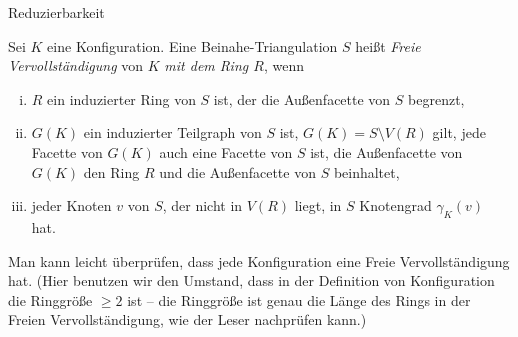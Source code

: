 \begin{section}{Reduzierbarkeit}
 \begin{definition}
  Sei $K$ eine Konfiguration. Eine Beinahe-Triangulation $S$ heißt \textit{Freie Vervollständigung} von $K$ \textit{mit dem Ring $R$}, wenn
  \begin{enumerate}[i)]
   \item $R$ ein induzierter Ring von $S$ ist, der die Außenfacette von $S$ begrenzt,
   \item $G(K)$ ein induzierter Teilgraph von $S$ ist, $G(K) = S \setminus V(R)$ gilt, jede Facette von $G(K)$ auch eine Facette von $S$ ist, die Außenfacette von $G(K)$ den Ring $R$ und die Außenfacette von $S$ beinhaltet,
   \item jeder Knoten $v$ von $S$, der nicht in $V(R)$ liegt, in $S$ Knotengrad $\gamma_K(v)$ hat.
  \end{enumerate}
 \end{definition}
 
 Man kann leicht überprüfen, dass jede Konfiguration eine Freie Vervollständigung hat. (Hier benutzen wir den Umstand, dass in der Definition von Konfiguration die Ringgröße $\geq 2$ ist -- die Ringgröße ist genau die Länge des Rings in der Freien Vervollständigung, wie der Leser nachprüfen kann.)

\end{section}
